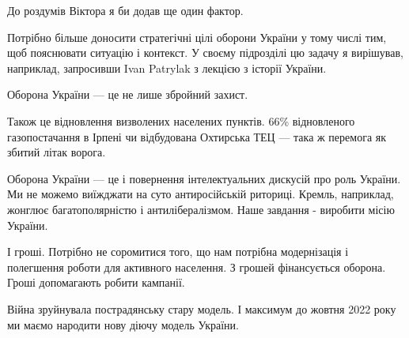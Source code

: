 До роздумів Віктора я би  додав ще один фактор. 

Потрібно більше доносити стратегічні цілі оборони України у тому числі тим, щоб
пояснювати ситуацію і контекст. У своєму підрозділі цю задачу я вирішував,
наприклад, запросивши Ivan  Patrylak з лекцією з історії України. 

Оборона України — це не лише збройний захист. 

Також це відновлення визволених населених пунктів. 66\% відновленого
газопостачання в Ірпені чи відбудована Охтирська ТЕЦ — така ж перемога як
збитий літак ворога.

Оборона України — це і повернення інтелектуальних дискусій про роль України. Ми
не можемо виїжджати на суто антиросійській риториці. Кремль, наприклад,
жонглює багатополярністю і антилібералізмом. Наше завдання - виробити місію
України.

І гроші. Потрібно не соромитися того, що нам потрібна модернізація і полегшення
роботи для активного населення. З грошей фінансується оборона. Гроші
допомагають робити кампанії.

Війна зруйнувала пострадянську стару модель. І максимум до жовтня 2022 року ми
маємо народити нову діючу модель України.

